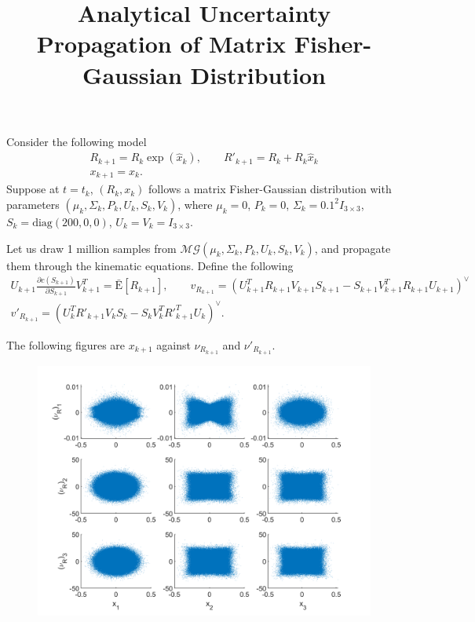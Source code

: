 \documentclass[10pt]{article}
\title{\vspace{-4ex}\textbf{Analytical Uncertainty Propagation of Matrix Fisher-Gaussian Distribution\vspace{-4ex}}}
\date{}
\newcommand{\expectbar}[1]{\ensuremath{\bar{\mathrm{E}}\left[ #1 \right]}}
\begin{document}
\maketitle

Consider the following model
\begin{gather*}
	R_{k+1} = R_k\exp(\hat{x}_k), \qquad R'_{k+1} = R_k + R_k\hat{x}_k \\
	x_{k+1} = x_k.
\end{gather*}
Suppose at $t=t_k$, $(R_k,x_k)$ follows a matrix Fisher-Gaussian distribution with parameters $(\mu_k,\Sigma_k,P_k,U_k,S_k,V_k)$, where $\mu_k = 0$, $P_k = 0$, $\Sigma_k = 0.1^2I_{3\times 3}$, $S_k = \mathrm{diag}(200,0,0)$, $U_k=V_k=I_{3\times 3}$.

Let us draw 1 million samples from $\mathcal{MG}(\mu_k,\Sigma_k,P_k,U_k,S_k,V_k)$, and propagate them through the kinematic equations.
Define the following
\begin{gather}
	U_{k+1}\frac{\partial c(S_{k+1})}{\partial S_{k+1}}V_{k+1}^T = \expectbar{R_{k+1}}, \qquad v_{R_{k+1}} = (U_{k+1}^TR_{k+1}V_{k+1}S_{k+1} - S_{k+1}V_{k+1}^TR_{k+1}U_{k+1})^\vee \\
	v'_{R_{k+1}} = (U_k^TR'_{k+1}V_kS_k - S_kV_k^TR'^T_{k+1}U_k)^\vee.
\end{gather}

The following figures are $x_{k+1}$ against $\nu_{R_{k+1}}$ and $\nu'_{R_{k+1}}$.

\begin{figure}[H]
	\centering
	\includegraphics{xvR}
\end{figure}
\end{document}

